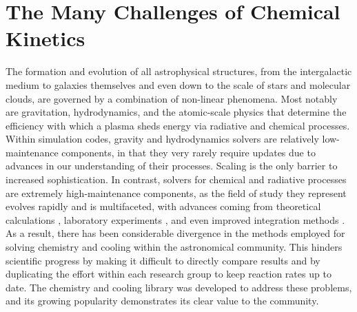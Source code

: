 \section{The Many Challenges of Chemical Kinetics}

The formation and evolution of all astrophysical structures, from
the intergalactic medium to galaxies themselves and even down to the scale of
stars and molecular clouds, are governed
by a combination of non-linear phenomena.  Most notably are gravitation,
hydrodynamics, and the atomic-scale physics that determine the
efficiency with which a plasma sheds energy via radiative and
chemical processes.  Within simulation codes, gravity and
hydrodynamics solvers are relatively low-maintenance components, in
that they very rarely require updates due to advances in our
understanding of their processes.  Scaling is the only barrier to
increased sophistication.
In contrast, solvers for chemical and radiative processes are
extremely high-maintenance components, as the field of study they
represent evolves rapidly and is multifaceted, with advances coming
from theoretical calculations \citep[e.g.,][]{2007MNRAS.377..705F,
  2007MNRAS.382..133W, 2008MNRAS.388.1627G, 2008ApJ...689.1105L,
  2012JChPh.137o4303L, 2014ApJ...790...10S, 2015MNRAS.453..810L,
  2016MNRAS.457.3732C, 2017MNRAS.466.2175C}, laboratory experiments
\citep[e.g.,][]{2010Sci...329...69K, 2010PhRvA..82d2708B,
  2011PhRvA..84e2709M, 2015JPhCS.635b2092R, 2015ApJS..219....6O,
  2016ApJ...816...31D, 2016ApJ...832...31V}, and even improved integration
methods \citep[e.g.,][]{CURTIS2017312, 2014JCoPh.256..854N}.  As a result, there
has been considerable divergence in the methods employed for solving chemistry
and cooling within the astronomical community.  This hinders scientific
progress by making it difficult to directly compare results and by
duplicating the effort
within each research group to keep reaction rates up to date. The
\grackle{} chemistry and cooling library was developed to address
these problems, and its growing popularity
demonstrates its clear value to the community.

